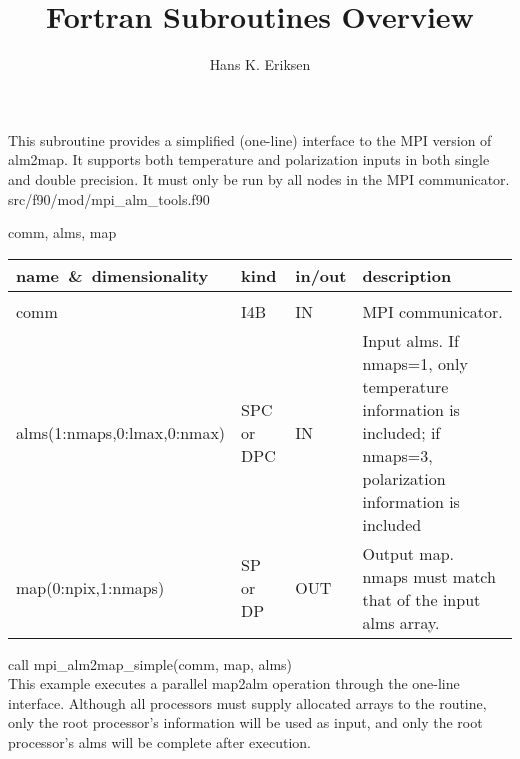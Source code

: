 
\sloppy


\title{\healpix Fortran Subroutines Overview}
 \section[mpi\_alm2map\_simple*]{ }
\label{sub:mpi_alm2map_simple}
\author{Hans K. Eriksen}

\begin{facility}
{This subroutine provides a simplified (one-line) interface to the MPI version of
alm2map. It supports both temperature and polarization inputs in both
single and double precision. It must only be run by all nodes in
the MPI communicator.  } 
{src/f90/mod/mpi\_alm\_tools.f90}
\end{facility}

\begin{f90format}
{comm, alms, map}
\end{f90format}

\begin{arguments}
{
\begin{tabular}{p{0.4\hsize} p{0.05\hsize} p{0.05\hsize} p{0.40\hsize}} \hline  
\textbf{name~\&~dimensionality} & \textbf{kind} & \textbf{in/out} & \textbf{description} \\ \hline
                   &   &   &                           \\ %
comm & I4B & IN & MPI communicator. \\
alms(1:nmaps,0:lmax,0:nmax) & SPC or DPC & IN & Input alms. If
nmaps=1, only temperature information is included; if nmaps=3,
polarization information is included \\ 
map(0:npix,1:nmaps) & SP or DP & OUT & Output map. nmaps must match 
that of the input alms array.\\
\end{tabular}
}
\end{arguments}

\begin{example}
{
\hspace*{1cm}call mpi\_alm2map\_simple(comm, map, alms)\\
}
{
This example executes a parallel map2alm operation through the
one-line interface. Although all processors must supply allocated
arrays to the routine, only the root processor's information will be
used as input, and only the root processor's alms will be complete
after execution. 
}
\end{example}

